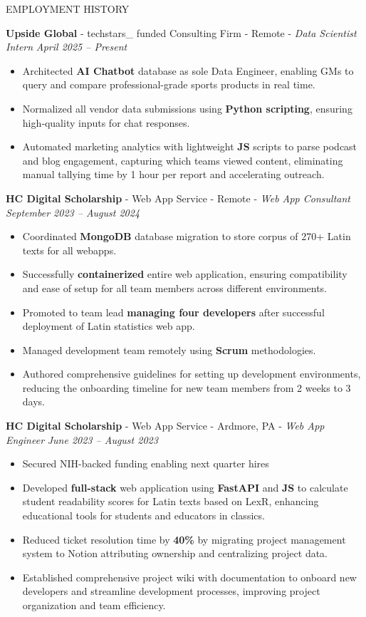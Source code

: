 \documentclass{resume3}
\begin{document}
\begin{rSection}{EMPLOYMENT HISTORY}

\vspace{0.15cm}
{\bf Upside Global} - techstars\_ funded Consulting Firm - Remote - {\em Data Scientist Intern} \hfill {\em April 2025 – Present}
\begin{itemize}
\item Architected \textbf{AI Chatbot} database as sole Data Engineer, enabling GMs to query and compare professional-grade sports products in real time.
\item Normalized all vendor data submissions using \textbf{Python scripting}, ensuring high‐quality inputs for chat responses.
\item Automated marketing analytics with lightweight \textbf{JS} scripts to parse podcast and blog engagement, capturing which teams viewed content, eliminating manual tallying time by 1 hour per report and accelerating outreach.
\end{itemize}

{\bf HC Digital Scholarship} - Web App Service - Remote - {\em Web App Consultant} \hfill {\em September 2023 – August 2024} 
\begin{itemize}
\item Coordinated \textbf{MongoDB} database migration to store corpus of 270+ Latin texts for all webapps.
\item Successfully \textbf{containerized} entire web application, ensuring compatibility and ease of setup for all team members across different environments. 
\item Promoted to team lead \textbf{managing four developers} after successful deployment of Latin statistics web app.
\item Managed development team remotely using \textbf{Scrum} methodologies.
\item Authored comprehensive guidelines for setting up development environments, reducing the onboarding timeline for new team members from 2 weeks to 3 days.
\end{itemize}

{\bf HC Digital Scholarship} - Web App Service - Ardmore, PA - {\em Web App Engineer} \hfill {\em June 2023 – August 2023} 
\begin{itemize}
\item Secured NIH-backed funding enabling next quarter hires 
\item Developed \textbf{full-stack} web application using \textbf{FastAPI} and \textbf{JS} to calculate student readability scores for Latin texts based on LexR, enhancing educational tools for students and educators in classics.
\item Reduced ticket resolution time by \textbf{40\%} by migrating project management system to Notion attributing ownership and centralizing project data. 
\item Established comprehensive project wiki with documentation to onboard new developers and streamline development processes, improving project organization and team efficiency.
\end{itemize}


\end{rSection}
\end{document}
